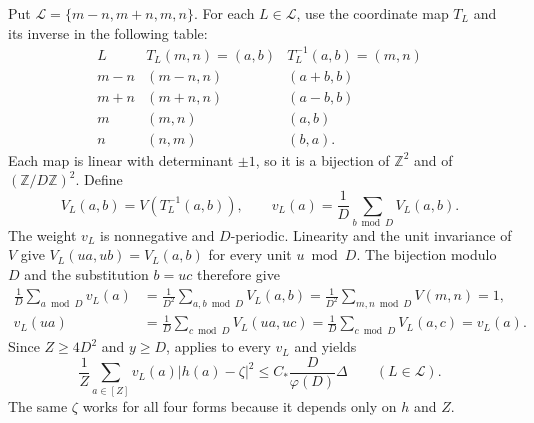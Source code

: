 \documentclass[twoside]{aomart}
\makeatletter
\theoremstyle{paperplain}
\theoremstyle{paperdefinition}
\renewenvironment{proof}[1][\proofname]{\par\pushQED{\qed}%
  \normalfont\topsep6\p@\@plus3\p@\relax\trivlist
  \item[\hskip\labelsep\itshape #1\@addpunct{.}]\ignorespaces
}{\popQED\endtrivlist\@endpefalse}
\newcommand{\Z}{\mathbb Z}
\numberwithin{equation}{section}
\makeatother
\begin{document}
\begin{proof}
Put $\mathcal L=\{m-n,m+n,m,n\}$.
For each $L\in\mathcal L$, use the coordinate map $T_L$ and its
inverse in the following table:
\begin{equation*}
 \begin{array}{c|c|c}
 L&T_L(m,n)=(a,b)&T_L^{-1}(a,b)=(m,n)\\ \hline
 m-n&(m-n,n)&(a+b,b)\\
 m+n&(m+n,n)&(a-b,b)\\
 m&(m,n)&(a,b)\\
 n&(n,m)&(b,a).
 \end{array}
 \end{equation*}
Each map is linear with determinant $\pm1$, so it is a bijection
of $\Z^2$ and of $(\Z/D\Z)^2$.
Define
\begin{equation*}
 V_L(a,b)=V(T_L^{-1}(a,b)),
 \qquad v_L(a)=\frac1D\sum_{b\bmod D}V_L(a,b).
 \end{equation*}
The weight $v_L$ is nonnegative and $D$-periodic.
Linearity and the unit invariance of $V$ give
$V_L(ua,ub)=V_L(a,b)$ for every unit $u\bmod D$.
The bijection modulo $D$ and the substitution $b=uc$ therefore give
\begin{equation*}
 \begin{aligned}
 \frac1D\sum_{a\bmod D}v_L(a)
 &=\frac1{D^2}\sum_{a,b\bmod D}V_L(a,b)
 =\frac1{D^2}\sum_{m,n\bmod D}V(m,n)=1,\\
 v_L(ua)
 &=\frac1D\sum_{c\bmod D}V_L(ua,uc)
 =\frac1D\sum_{c\bmod D}V_L(a,c)=v_L(a).
 \end{aligned}
 \end{equation*}
Since $Z\ge4D^2$ and $y\ge D$, 
applies to every $v_L$ and yields
\begin{equation}
 \frac1Z\sum_{a\in[Z]}v_L(a)|h(a)-\zeta|^2
 \le C_*\frac D{\varphi(D)}\Delta
 \qquad(L\in\mathcal L).
 \label{con:comparison-marginal-concentration}
\end{equation}
The same $\zeta$ works for all four forms because it depends only
on $h$ and $Z$.


\end{proof}
\end{document}
